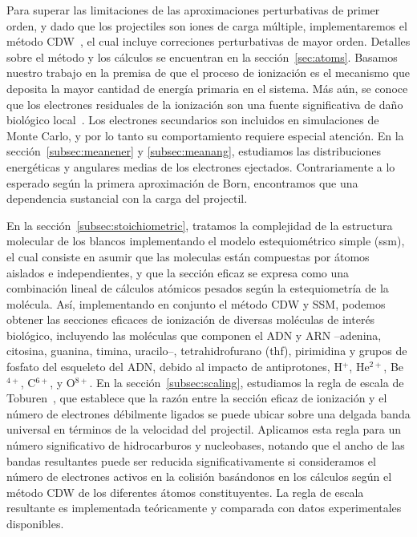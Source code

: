Para superar las limitaciones de las aproximaciones perturbativas de 
primer orden, y dado que los projectiles son iones de carga múltiple, 
implementaremos el método CDW~\cite{galassi2000,fainstein1988,miraglia2008,miraglia2009}, el 
cual incluye correciones perturbativas de mayor orden. Detalles sobre 
el método y los cálculos se encuentran en la sección~\ref{sec:atoms}.
Basamos nuestro trabajo en la premisa de que el proceso de ionización 
es el mecanismo que deposita la mayor cantidad de energía primaria en el
sistema. Más aún, se conoce que los electrones residuales de la ionización
son una fuente significativa de daño biológico local~\cite{Denifl2011}. 
Los electrones secundarios son incluidos en simulaciones de Monte Carlo,
y por lo tanto su comportamiento requiere especial atención.
En la sección~\ref{subsec:meanener} y \ref{subsec:meanang}, estudiamos
las distribuciones energéticas y angulares medias de los electrones 
ejectados. Contrariamente a lo esperado según la primera aproximación 
de Born, encontramos que una dependencia sustancial con la carga del 
projectil. 

En la sección~\ref{subsec:stoichiometric}, tratamos la complejidad de la
estructura molecular de los blancos implementando el modelo estequiométrico 
simple (\acs{ssm}), el cual consiste en asumir que las moleculas están 
compuestas por átomos aislados e independientes, y que la sección 
eficaz se expresa como una combinación lineal de cálculos atómicos 
pesados según la estequiometría de la 
molécula. Así, implementando en conjunto el método CDW y SSM, podemos
obtener las secciones eficaces de ionización de diversas moléculas de 
interés biológico, incluyendo las moléculas que componen el ADN y ARN 
--adenina, citosina, guanina, timina, uracilo--, tetrahidrofurano 
(\acs{thf}), pirimidina y grupos de fosfato del esqueleto del ADN, 
debido al impacto de antiprotones, H$^{+}$, He$^{2+}$, Be$^{4+}$, 
C$^{6+}$, y O$^{8+}$. 
En la sección~\ref{subsec:scaling}, estudiamos la regla de escala de 
Toburen~\cite{toburen1975,toburen1976}, que establece que la razón entre
la sección eficaz de ionización y el número de electrones débilmente
ligados se puede ubicar sobre una delgada banda universal en términos 
de la velocidad del projectil. Aplicamos esta regla para un número 
significativo de hidrocarburos y nucleobases, notando que el ancho de las
bandas resultantes puede ser reducida significativamente si consideramos
el número de electrones activos en la colisión basándonos en los 
cálculos según el método CDW de los diferentes átomos constituyentes. 
La regla de escala resultante es implementada teóricamente y comparada 
con datos experimentales disponibles.

